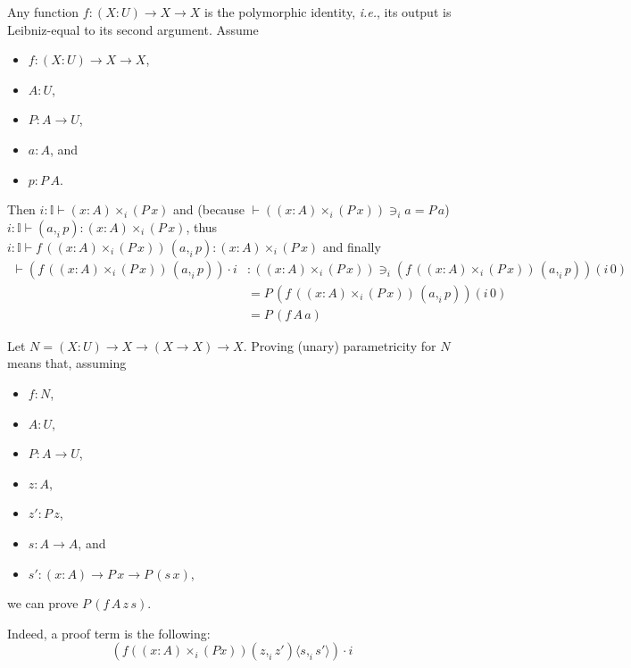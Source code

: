 \documentclass[english]{PaperTools/latex/lipics}
\newcommand\CP[3]{(#2,_{#1} #3)}
\newcommand\CTimes[2]{(#2) ×_{#1}}
\newcommand\param[1]{\!\cdot\!#1}
\newcommand\op[1]{∋_{#1}}
\newcommand\fp[3]{⟨#2 ,_{#1} #3⟩}
\newcommand\mor[2]{({#1}\,{#2})}
\newcommand\proj[2]{{#2}\mor{#1}0}
\def\ie{\textit{i.e.}}
\begin{document}
\begin{example}
  Any function $f : (X : U) → X → X$ is the polymorphic identity, \ie,
  its output is Leibniz-equal to its second argument.
  Assume
  \begin{itemize}
    \item $f : (X : U) → X → X$,
    \item $A : U$,
    \item $P : A → U$,
    \item $a : A$, and
    \item $p : P\, A$.
  \end{itemize}
  Then
  $i:𝕀⊢\CTimes i {x:A} {(P\,x)}$
  and
  (because $⊢ (\CTimes i {x:A} {(P\,x)}) \op i a = P\,a$)
  $i:𝕀⊢\CP i a p : \CTimes i {x:A} {(P\,x)}$, thus
  $i:𝕀⊢f\, (\CTimes i {x:A} {(P\,x)})\, {\CP i a p} : \CTimes i {x:A} {(P\,x)}$
  and finally
  \begin{align*}
    ⊢(f\, (\CTimes i {x:A} {(P\,x)})\, {\CP i a p}) \param i
   &: (\CTimes i {x:A} {(P\,x)}) \op i \proj i {(f\, (\CTimes i {x:A} {(P\,x)})\, {\CP i a p})} \\
   &= P\, \proj i {(f\, (\CTimes i {x:A} {(P\,x)})\, {\CP i a p})} \\
   &= P\, (f\, A\, a)
  \end{align*}
\end{example}

\begin{example}
Let $N = (X : U) → X → (X → X) → X$.
Proving (unary) parametricity for $N$ means that, assuming
\begin{itemize}
\item $f : N$,
\item $A : U$,
\item $P : A → U$,
\item $z : A$,
\item $z' : P\, z$,
\item $s : A → A$, and
\item $s' : (x:A) → P\, x → P\, (s\, x)$,
\end{itemize}
we can prove $P\, (f\, A\, z\, s)$.

Indeed, a proof term is the following:
%
\[
(f (\CTimes i {x:A} (P x)) \CP i z {z'} \fp i s {s'}) \param i
\]
\end{example}
\end{document}
